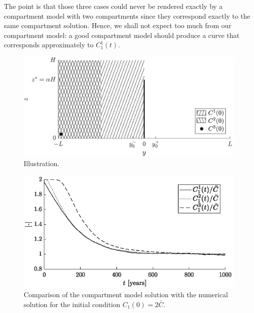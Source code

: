 The point is that those three cases could never be rendered exactly by a compartment model with two compartments since they correspond exactly to the same compartment solution. Hence, we shall not expect too much from our compartment model: a good compartment model should produce a curve that corresponds approximately to $C_1^1(t)$.
\begin{figure}[!htp]
	\centering
	\includegraphics[width = \textwidth]{fig/problem2box/CI_init.eps}
	\caption{Illustration.}
	\label{fig:CI_init}
\end{figure}

\begin{figure}[!htp]
	\centering
	\includegraphics[scale=1]{fig/problem2box/CI_1000years.eps}
	\caption{Comparison of the compartment model solution with the numerical solution for the initial condition $C_1(0) = 2\bar C$.}
	\label{fig:CI_evol}
\end{figure}

